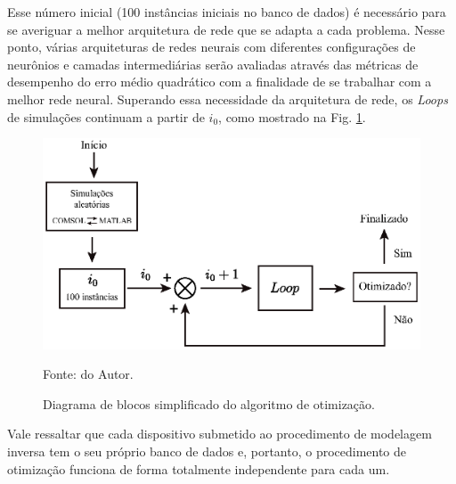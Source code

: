 
Esse número inicial (100 instâncias iniciais no banco de dados) é necessário para se averiguar a melhor arquitetura de rede que se adapta a cada problema. Nesse ponto, várias arquiteturas de redes neurais com diferentes configurações de neurônios e camadas intermediárias serão avaliadas através das métricas de desempenho do erro médio quadrático com a finalidade de se trabalhar com a melhor rede neural. Superando essa necessidade da arquitetura de rede, os \textit{Loops} de simulações continuam a partir de $i_{0}$, como mostrado na Fig. \ref{fig: loopAlgorithm}.



\begin{figure}[H]
    \centering
    \includegraphics{04-Figuras/loopAlgorithm.eps}
    \caption{Diagrama de blocos simplificado do algoritmo de otimização.} \par
    Fonte: do Autor.
    \label{fig: loopAlgorithm}
\end{figure}


Vale ressaltar que cada dispositivo submetido ao procedimento de modelagem inversa tem o seu próprio banco de dados e, portanto, o procedimento de otimização funciona de forma totalmente independente para cada um.

